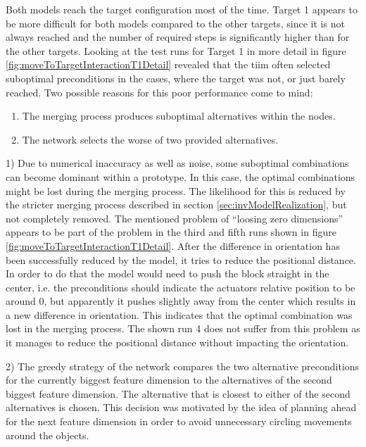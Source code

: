 Both models reach the target configuration most of the time. Target 1 appears to be more difficult for both models compared to the other targets, since it is not always reached and the number of required steps is significantly higher than for the other targets. 
Looking at the test runs for Target 1 in more detail in figure \ref{fig:moveToTargetInteractionT1Detail} revealed that the \gls{tiim} often selected suboptimal preconditions in the cases, where the target was not, or just barely reached.
Two possible reasons for this poor performance come to mind:
\begin{enumerate}
\item The merging process produces suboptimal alternatives within the nodes.
\item The network selects the worse of two provided alternatives.
\end{enumerate}

1) Due to numerical inaccuracy as well as noise, some suboptimal combinations can become dominant within a prototype. In this case, the optimal combinations might be lost during the merging process. The likelihood for this is reduced by the stricter merging process described in section \ref{sec:invModelRealization}, but not completely removed. The mentioned problem of \enquote{loosing zero dimensions} appears to be part of the problem in the third and fifth runs shown in figure \ref{fig:moveToTargetInteractionT1Detail}. After the difference in orientation has been successfully reduced by the model, it tries to reduce the positional distance. In order to do that the model would need to push the block straight in the center, i.e. the preconditions should indicate the actuators relative position to be around 0, but apparently it pushes slightly away from the center which results in a new difference in orientation. This indicates that the optimal combination was lost in the merging process. The shown run 4 does not suffer from this problem as it manages to reduce the positional distance without impacting the orientation.

2) The greedy strategy of the network compares the two alternative preconditions for the currently biggest feature dimension to the alternatives of the second biggest feature dimension. The alternative that is closest to either of the second alternatives is chosen. This decision was motivated by the idea of planning ahead for the next feature dimension in order to avoid unnecessary circling movements around the objects.

